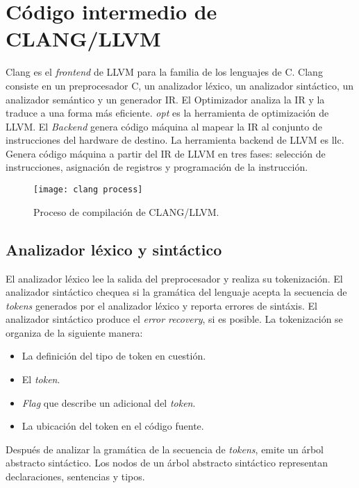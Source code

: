 \chapter{Código intermedio de CLANG/LLVM}

Clang es el \emph{frontend} de LLVM para la familia de los lenguajes de C. Clang consiste 
en un preprocesador C, un analizador léxico, un analizador sintáctico, un analizador 
semántico y un generador IR.
El Optimizador analiza la IR y la traduce a una forma más eficiente. \emph{opt} es la 
herramienta de optimización de LLVM.
El \emph{Backend} genera código máquina al mapear la IR al conjunto de instrucciones del 
hardware de destino. La herramienta backend de LLVM es llc. 
Genera código máquina a partir del IR de LLVM en tres fases: selección de instrucciones, 
asignación de registros y programación de la instrucción.

\begin{figure}[ht]
    \begingroup
        \centering
            \texttt{[image: clang process]}
            \caption{Proceso de compilación de CLANG/LLVM.}
            \label{fig:clang process}
        \par
    \endgroup
\end{figure}

\section{Analizador léxico y sintáctico}

El analizador léxico lee la salida del preprocesador y realiza su tokenización.
El analizador sintáctico chequea si la gramática del lenguaje acepta la 
secuencia de \emph{tokens} generados por el analizador léxico y reporta errores de sintáxis.
El analizador sintáctico produce el \emph{error recovery}, si es posible.
La tokenización se organiza de la siguiente manera:
\begin{itemize}
    \item La definición del tipo de token en cuestión.
    \item El \emph{token}.
    \item \emph{Flag} que describe un adicional del \emph{token}.
    \item La ubicación del token en el código fuente.
\end{itemize}
Después de analizar la gramática de la secuencia de \emph{tokens}, 
emite un árbol abstracto sintáctico. Los nodos de un árbol abstracto sintáctico 
representan declaraciones, sentencias y tipos\cite{CLANGast}.

